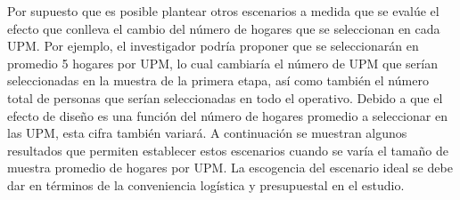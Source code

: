 \documentclass[12pt,spanish,]{book}
\begin{document}
Por supuesto que es posible plantear otros escenarios a medida que se evalúe el efecto que conlleva el cambio del número de hogares que se seleccionan en cada UPM. Por ejemplo, el investigador podría proponer que se seleccionarán en promedio 5 hogares por UPM, lo cual cambiaría el número de UPM que serían seleccionadas en la muestra de la primera etapa, así como también el número total de personas que serían seleccionadas en todo el operativo. Debido a que el efecto de diseño es una función del número de hogares promedio a seleccionar en las UPM, esta cifra también variará. A continuación se muestran algunos resultados que permiten establecer estos escenarios cuando se varía el tamaño de muestra promedio de hogares por UPM. La escogencia del escenario ideal se debe dar en términos de la conveniencia logística y presupuestal en el estudio.
\end{document}
